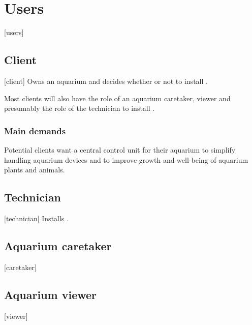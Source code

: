 \section{Users}[users]

\subsection{Client}[client]
Owns an aquarium and decides whether or not to install \ThisProjectName.

Most clients will also have the role of an aquarium caretaker, viewer and presumably the role of the technician to install \ThisProjectName.

\subsubsection{Main demands}
Potential clients want a central control unit for their aquarium to simplify handling aquarium devices and to improve 
growth and well-being of aquarium plants and animals.


\subsection{Technician}[technician]
Installs \ThisProjectName.

\subsection{Aquarium caretaker}[caretaker]

\subsection{Aquarium viewer}[viewer]